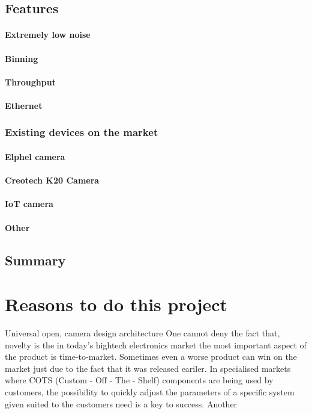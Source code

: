   \subsection{Features}
            \paragraph{Extremely low noise}
            \paragraph{Binning}
            \paragraph{Throughput}
            \paragraph{Ethernet}

    \subsubsection{Existing devices on the market}
      \paragraph{Elphel camera}
      \paragraph{Creotech K20 Camera}
      \paragraph{IoT camera}
      \paragraph{Other}
  
  \subsection{Summary}

\section{Reasons to do this project}
 Universal open, camera design architecture 
One cannot deny the fact that, novelty is the  in today's hightech electronics market the most important aspect of the
product is time-to-market. Sometimes even a worse product can win on the market just due to the fact that it was
released eariler.  In specialised markets where COTS (Custom - Off - The - Shelf) components are being used by
customers, the possibility to quickly adjust the parameters of a specific system given suited to the customers need is a
key to success.  Another

